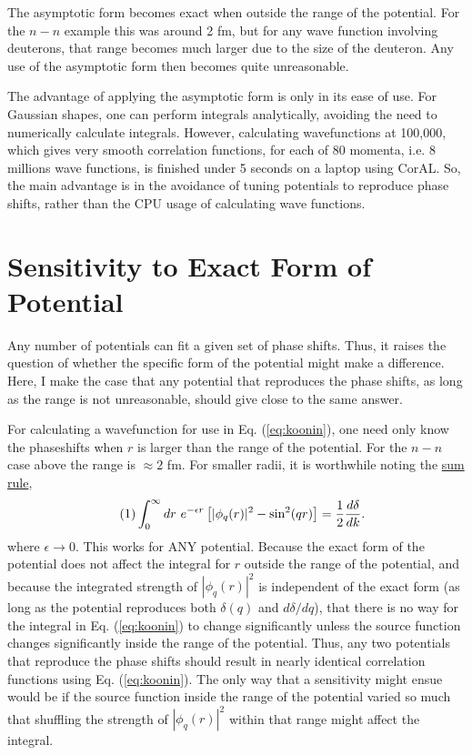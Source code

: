 \documentclass[12pt]{article}
\numberwithin{equation}{section}
\numberwithin{figure}{section}
\newcommand\eqnumber{\addtocounter{equation}{1}\tag{\theequation}}
\begin{document}
The asymptotic form becomes exact when outside the range of the potential. For the $n-n$ example this was around 2 fm, but for any wave function involving deuterons, that range becomes much larger due to the size of the deuteron. Any use of the asymptotic form then becomes quite unreasonable.

The advantage of applying the asymptotic form is only in its ease of use. For Gaussian shapes, one can perform integrals analytically, avoiding the need to numerically calculate integrals. However, calculating wavefunctions at 100,000, which gives very smooth correlation functions, for each of 80 momenta, i.e. 8 millions wave functions, is finished under 5 seconds on a laptop using CorAL. So, the main advantage is in the avoidance of tuning potentials to reproduce phase shifts, rather than the CPU usage of calculating wave functions.


\section{Sensitivity to Exact Form of Potential}

Any number of potentials can fit a given set of phase shifts. Thus, it raises the question of whether the specific form of the potential might make a difference. Here, I make the case that any potential that reproduces the phase shifts, as long as the range is not unreasonable, should give close to the same answer.

For calculating a wavefunction for use in Eq. (\ref{eq:koonin}), one need only know the phaseshifts when $r$ is larger than the range of the potential. For the $n-n$ case above the range is $\approx 2$ fm. For smaller radii, it is worthwhile noting the \href{https://journals.aps.org/pr/abstract/10.1103/PhysRev.76.38}{sum rule},
\begin{align*}\eqnumber
\int_0^\infty dr~e^{-\epsilon r}\left[ |\phi_{q}(r)|^2-\sin^2(qr)\right]&=\frac{1}{2}\frac{d\delta}{dk}.
\end{align*}
where $\epsilon\rightarrow 0$. This works for ANY potential. Because the exact form of the potential does not affect the integral for $r$ outside the range of the potential, and because the integrated strength of $|\phi_q(r)|^2$ is independent of the exact form (as long as the potential reproduces both $\delta(q)$ and $d\delta/dq$), that there is no way for the integral in Eq. (\ref{eq:koonin}) to change significantly unless the source function changes significantly inside the range of the potential. Thus, any two potentials that reproduce the phase shifts should result in nearly identical correlation functions using Eq. (\ref{eq:koonin}). The only way that a sensitivity might ensue would be if the source function inside the range of the potential varied so much that shuffling the strength of $|\phi_q(r)|^2$ within that range might affect the integral.
\end{document}
